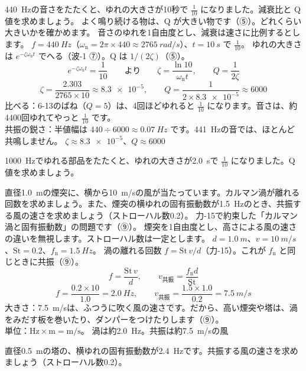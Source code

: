 \label{ph:波-2:ex11}
\begin{phreidai}[音さの Q 値]
\qty{440}{Hz}の音さをたたくと、ゆれの大きさが10秒で $\tfrac{1}{10}$ になりました。減衰比と Q 値を求めましょう。
\phbamen
よく鳴り続ける物は、Q が大きい物です（⑤）。どれくらい大きいかを確かめます。
\phmushi
音さのゆれを1自由度とし、減衰は速さに比例するとします。
\phzu
$f=\qty{440}{Hz}$（$\omega_{\mathrm n}=2\pi\times440\approx\qty{2765}{rad/s}$）、$t=\qty{10}{s}$ で $\tfrac{1}{10}$。
\phriyu
ゆれの大きさは $e^{-\zeta\omega_{\mathrm n}t}$ でへる（波-1 ⑦）。Q は $1/(2\zeta)$（⑤）。
\phtateru
\[e^{-\zeta\omega_{\mathrm n}t}=\frac{1}{10}\qquad\text{より}\qquad \zeta=\frac{\ln10}{\omega_{\mathrm n}t},\qquad Q=\frac{1}{2\zeta}\]
\phtoku
\[\zeta=\frac{2.303}{2765\times10}\approx\num{8.3e-5},\qquad Q=\frac{1}{2\times\num{8.3e-5}}\approx\num{6000}\]
\phtashikame
比べる：6-13のばね（$Q=5$）は、4回ほどゆれると $\tfrac{1}{10}$ になります。音さは、約4400回ゆれてやっと $\tfrac{1}{10}$ です。\\
共振の鋭さ：半値幅は $440\div6000\approx\qty{0.07}{Hz}$ です。\qty{441}{Hz}の音では、ほとんど共鳴しません。
\kotae $\zeta\approx\num{8.3e-5}$、$Q\approx\num{6000}$
\end{phreidai}
\begin{jibun}
\qty{1000}{Hz}でゆれる部品をたたくと、ゆれの大きさが\qty{2.0}{s}で $\tfrac{1}{10}$ になりました。Q 値を求めましょう。
\end{jibun}

\label{ph:波-2:ex12}
\begin{phreidai}[風でゆれる煙突]
直径\qty{1.0}{m}の煙突に、横から\qty{10}{m/s}の風が当たっています。カルマン渦が離れる回数を求めましょう。また、煙突の横ゆれの固有振動数が\qty{1.5}{Hz}のとき、共振する風の速さを求めましょう（ストローハル数0.2）。
\phbamen
力-15で約束した「カルマン渦と固有振動数」の問題です（⑨）。
\phmushi
煙突を1自由度とし、高さによる風の速さの違いを無視します。ストローハル数は一定とします。
\phzu
$d=\qty{1.0}{m}$、$v=\qty{10}{m/s}$、$\mathrm{St}=0.2$、$f_{\mathrm n}=\qty{1.5}{Hz}$。
\phriyu
渦の離れる回数 $f=\mathrm{St}\,v/d$（力-15）。これが $f_{\mathrm n}$ と同じときに共振（⑨）。
\phtateru
\[f=\frac{\mathrm{St}\,v}{d},\qquad v_{\text{共振}}=\frac{f_{\mathrm n}d}{\mathrm{St}}\]
\phtoku
\[f=\frac{0.2\times10}{1.0}=\qty{2.0}{Hz},\qquad v_{\text{共振}}=\frac{1.5\times1.0}{0.2}=\qty{7.5}{m/s}\]
\phtashikame
大きさ：\qty{7.5}{m/s}は、ふつうに吹く風の速さです。だから、高い煙突や塔は、渦をみだす板を巻いたり、ダンパーをつけたりします（⑨）。\\
単位：$\text{Hz}\times\text{m}=\text{m/s}$。
\kotae 渦は約\qty{2.0}{Hz}。共振は約\qty{7.5}{m/s}の風
\end{phreidai}
\begin{jibun}
直径\qty{0.5}{m}の塔の、横ゆれの固有振動数が\qty{2.4}{Hz}です。共振する風の速さを求めましょう（ストローハル数0.2）。
\end{jibun}

